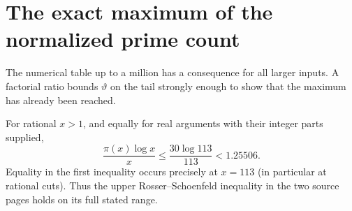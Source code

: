 \section{The exact maximum of the normalized prime count}
\label{sec:chebsharp}
The numerical table up to a million has a consequence for all larger inputs. A factorial ratio bounds $\vartheta$ on the tail strongly enough to show that the maximum has already been reached.

\begin{theorem}
For rational $x>1$, and equally for real arguments with their integer parts supplied,
\[
 \frac{\pi(x)\log x}{x}\le \frac{30\log113}{113}<1.25506 .
\]
Equality in the first inequality occurs precisely at $x=113$ (in particular at rational cuts). Thus the upper Rosser--Schoenfeld inequality in the two source pages holds on its full stated range.
\end{theorem}
